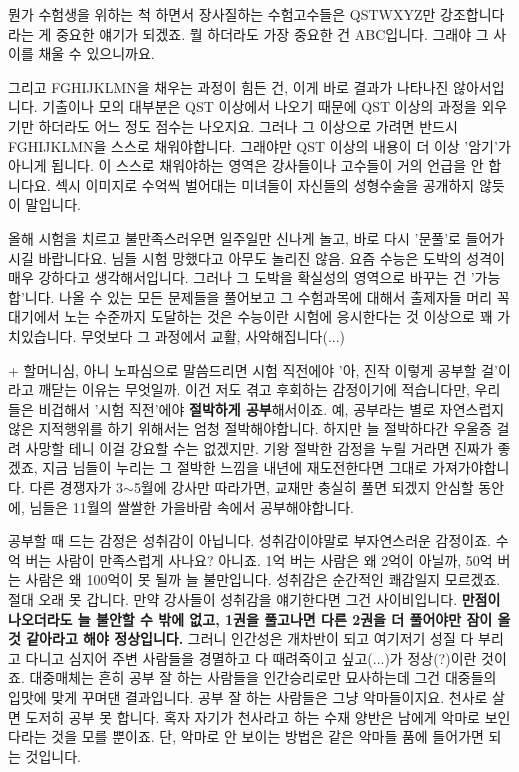 뭔가 수험생을 위하는 척 하면서 장사질하는 수험고수들은 QSTWXYZ만 강조합니다라는 게 중요한 얘기가 되겠죠.
뭘 하더라도 가장 중요한 건 ABC입니다. 그래야 그 사이를 채울 수 있으니까요.
\vspace{5mm}

그리고 FGHIJKLMN을 채우는 과정이 힘든 건, 이게 바로 결과가 나타나진 않아서입니다.
기출이나 모의 대부분은 QST 이상에서 나오기 때문에 QST 이상의 과정을 외우기만 하더라도 어느 정도 점수는 나오지요.
그러나 그 이상으로 가려면 반드시 FGHIJKLMN을 스스로 채워야합니다. 그래야만 QST 이상의 내용이 더 이상 '암기'가 아니게 됩니다.
이 스스로 채워야하는 영역은 강사들이나 고수들이 거의 언급을 안 합니다요.
섹시 이미지로 수억씩 벌어대는 미녀들이 자신들의 성형수술을 공개하지 않듯이 말입니다.
\vspace{5mm}

올해 시험을 치르고 불만족스러우면 일주일만 신나게 놀고, 바로 다시 '문풀'로 들어가시길 바랍니다요.
님들 시험 망했다고 아무도 놀리진 않음. 요즘 수능은 도박의 성격이 매우 강하다고 생각해서입니다.
그러나 그 도박을 확실성의 영역으로 바꾸는 건 '가능합'니다.
나올 수 있는 모든 문제들을 풀어보고 그 수험과목에 대해서 출제자들 머리 꼭대기에서 노는 수준까지 도달하는 것은
수능이란 시험에 응시한다는 것 이상으로 꽤 가치있습니다. 무엇보다 그 과정에서 교활, 사악해집니다(...)
\vspace{5mm}

+ 할머니심, 아니 노파심으로 말씀드리면
시험 직전에야 '아, 진작 이렇게 공부할 걸'이라고 깨닫는 이유는 무엇일까.
이건 저도 겪고 후회하는 감정이기에 적습니다만, 우리들은 비겁해서 '시험 직전'에야 \textbf{\textbf{절박}하게 공부}해서이죠.
예, 공부라는 별로 자연스럽지 않은 지적행위를 하기 위해서는 엄청 절박해야합니다.
하지만 늘 절박하다간 우울증 걸려 사망할 테니 이걸 강요할 수는 없겠지만.
기왕 절박한 감정을 누릴 거라면 진짜가 좋겠죠, 지금 님들이 누리는 그 절박한 느낌을 내년에 재도전한다면 그대로 가져가야합니다.
다른 경쟁자가 3$\sim$5월에 강사만 따라가면, 교재만 충실히 풀면 되겠지 안심할 동안에, 님들은 11월의 쌀쌀한 가을바람 속에서 공부해야합니다.
\vspace{5mm}

공부할 때 드는 감정은 성취감이 아닙니다. 성취감이야말로 부자연스러운 감정이죠.
수억 버는 사람이 만족스럽게 사나요? 아니죠. 1억 버는 사람은 왜 2억이 아닐까, 50억 버는 사람은 왜 100억이 못 될까 늘 불만입니다.
성취감은 순간적인 쾌감일지 모르겠죠. 절대 오래 못 갑니다. 만약 강사들이 성취감을 얘기한다면 그건 사이비입니다.
\textbf{만점이 나오더라도 늘 불안할 수 밖에 없고, 1권을 풀고나면 다른 2권을 더 풀어야만 잠이 올 것 같아라고 해야 정상입니다.}
그러니 인간성은 개차반이 되고 여기저기 성질 다 부리고 다니고 심지어 주변 사람들을 경멸하고 다 때려죽이고 싶고(...)가 정상(?)이란 것이죠.
대중매체는 흔히 공부 잘 하는 사람들을 인간승리로만 묘사하는데 그건 대중들의 입맛에 맞게 꾸며댄 결과입니다.
공부 잘 하는 사람들은 그냥 악마들이지요.
천사로 살면 도저히 공부 못 합니다. 혹자 자기가 천사라고 하는 수재 양반은 남에게 악마로 보인다라는 것을 모를 뿐이죠.
단, 악마로 안 보이는 방법은 같은 악마들 품에 들어가면 되는 것입니다.
\vspace{5mm}

